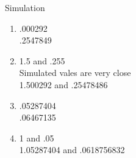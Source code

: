 \documentclass{article}
\begin{document}
Simulation
\begin{enumerate}
\item
.000292\\
.2547849
\item
1.5 and .255\\
Simulated vales are very close\\
1.500292 and .25478486\\
\item
.05287404 \\
.06467135


\item
1 and .05 \\
1.05287404 and .0618756832
\end{enumerate}
\end{document}
